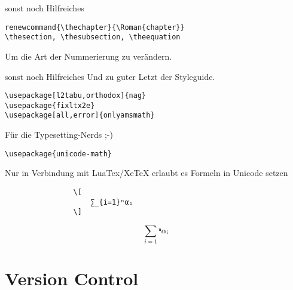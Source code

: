 \documentclass{beamer}
\begin{document}
\begin{frame}[fragile]{sonst noch Hilfreiches}
    \begin{verbatim}
renewcommand{\thechapter}{\Roman{chapter}}
\thesection, \thesubsection, \theequation
    \end{verbatim}
    Um die Art der Nummerierung zu verändern.
\end{frame}

\begin{frame}[fragile]{sonst noch Hilfreiches}
    Und zu guter Letzt der Styleguide.
    \begin{verbatim}
\usepackage[l2tabu,orthodox]{nag}
\usepackage{fixltx2e}
\usepackage[all,error]{onlyamsmath}
    \end{verbatim}
\end{frame}

\begin{frame}[fragile]{Für die Typesetting-Nerds ;-)}
    \begin{verbatim}
\usepackage{unicode-math}
    \end{verbatim}
    Nur in Verbindung mit LuaTex/XeTeX erlaubt es Formeln in Unicode setzen
    \begin{verbatim}
                \[
                    ∑_{i=1}ⁿαᵢ
                \]
    \end{verbatim}
        \[
            ∑_{i=1}ⁿαᵢ
        \]
\end{frame}

\section{Version Control}
\label{sec:version_control}

\subsection{}
\end{document}
